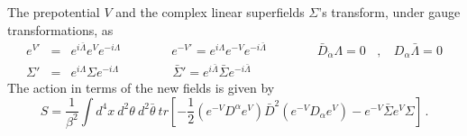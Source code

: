 \documentclass[a4paper,12pt]{article}
\begin{document}
The prepotential $V$ and the complex linear
superfields $\Sigma$'s transform, under gauge transformations, as
\begin{eqnarray}
e^{V'}&=&e^{i\bar{\Lambda}} e^V e^{-i\Lambda}\qquad \qquad 
e^{-V'}=e^{i\Lambda} e^{-V }e^{-i\bar{\Lambda}}
\qquad \qquad \bar D_{\dot\alpha} \Lambda=0~~~~,~~~~ D_\alpha\bar{\Lambda}=0
\nonumber\\
\Sigma'&=&e^{i\Lambda} \Sigma e^{-i\Lambda}\qquad \qquad 
~\bar\Sigma' =e^{i\bar{\Lambda}}\bar\Sigma e^{-i\bar{\Lambda}}
\end{eqnarray}
The action in terms of the new fields is given by
\begin{equation}
S=\frac{1}{\beta^2} \int d^4x~ d^2\theta~ d^2\bar{\theta}~tr\left[-\frac{1}{2}
(e^{-V}D^\alpha e^V)\bar D^2(e^{-V}D_\alpha e^V)-e^{-V} \bar\Sigma e^V \Sigma
\right] \, .
\label{actionprep}
\end{equation}

\end{document}
